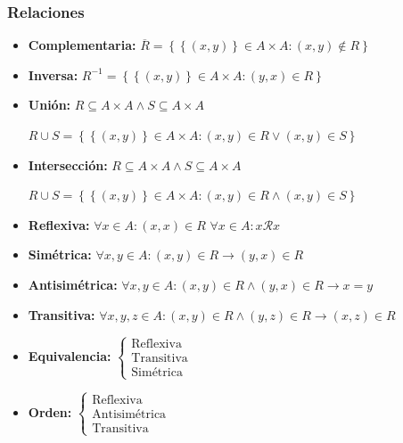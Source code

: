 \subsubsection{Relaciones}
\begin{itemize}
	\item \textbf{Complementaria:} $\overline{R} = \left\{ \left\{ (x,y) \right\} \in A \times A: (x,y) \notin R\right\}$
	
	\item \textbf{Inversa:} $R^{-1} = \left\{ \left\{ (x,y) \right\} \in A \times A: (y,x) \in R\right\}$
	
	\item \textbf{Unión:} $R \subseteq A \times A \wedge S \subseteq A \times A$
	\begin{center}
		$R \cup S = \left\{ \left\{ (x,y) \right\} \in A \times A: (x,y) \in R \lor (x,y) \in S \right\}$
	\end{center}
	
	\item \textbf{Intersección:} $R \subseteq A \times A \wedge S \subseteq A \times A$
	\begin{center}
		$R \cup S = \left\{ \left\{ (x,y) \right\} \in A \times A: (x,y) \in R \wedge (x,y) \in S \right\}$
	\end{center}
	
	\item \textbf{Reflexiva:} $\forall x \in A: (x,x) \in R$
	$\forall x \in A: x \mathcal{R} x$
	
	\item \textbf{Simétrica:} $\forall x,y \in A: (x,y) \in R \rightarrow (y,x) \in R$
	
	\item \textbf{Antisimétrica:} $\forall x,y \in A: (x,y) \in R \wedge (y,x) \in R \rightarrow x = y$
	
	\item \textbf{Transitiva:} $\forall x,y,z \in A: (x,y) \in R \wedge (y,z) \in R \rightarrow (x,z) \in R$
	
	\item \textbf{Equivalencia:} $\left\{ \begin{array}{c}
	\text{Reflexiva}\\
	\text{Transitiva}\\
	\text{Simétrica}\end{array}\right.$
	
	\item \textbf{Orden:} $\left\{ \begin{array}{c}
	\text{Reflexiva}\\
	\text{Antisimétrica}\\
	\text{Transitiva}\end{array}\right.$
\end{itemize}

